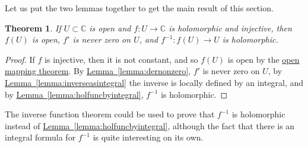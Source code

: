 \documentclass[12pt,openany]{book}
\newcommand{\C}{{\mathbb{C}}}
\theoremstyle{plain}
\newtheorem{thm}{Theorem}[section]
\theoremstyle{remark}
\theoremstyle{definition}
\theoremstyle{exercise}
\theoremstyle{example}
\newcommand{\lemmaref}[1]{\hyperref[#1]{Lemma~\ref*{#1}}}
\begin{document}
Let us put the two lemmas together to get the main result of this section.

\begin{thm}
If $U \subset \C$ is open and $f \colon U \to \C$ is holomorphic and
injective, then $f(U)$ is open, $f'$ is never zero on $U$, and $f^{-1}
\colon f(U) \to U$ is holomorphic.
\end{thm}

\begin{proof}
If $f$ is injective, then it is not constant, and so $f(U)$ is open by
the \hyperref[thm:OMT]{open mapping theorem}.
By \lemmaref{lemma:dernonzero}, $f'$ is never zero
on $U$, by \lemmaref{lemma:inverseasintegral} the inverse is locally defined
by an integral, and by
\lemmaref{lemma:holfuncbyintegral},
$f^{-1}$ is holomorphic.
\end{proof}

The inverse function theorem could be used to prove that $f^{-1}$ is
holomorphic instead of \lemmaref{lemma:holfuncbyintegral}, although the
fact that there is an integral formula for $f^{-1}$ is quite interesting on
its own.
\end{document}
